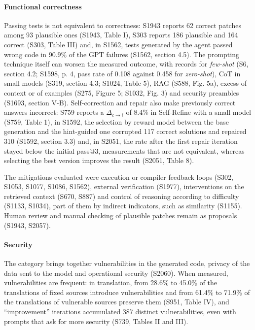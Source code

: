 \paragraph{Functional correctness}
Passing tests is not equivalent to correctness: S1943 reports 62 correct patches among 93 plausible ones (S1943, Table I), S303 reports 186 plausible and 164 correct (S303, Table III) and, in S1562, tests generated by the agent passed wrong code in 90.9\% of the GPT failures (S1562, section 4.5).
The prompting technique itself can worsen the measured outcome, with records for \textit{few-shot} (S6, section 4.2; S1598, p. 4, pass rate of 0.108 against 0.458 for \textit{zero-shot}), CoT in small models (S319, section 4.3; S1024, Table 5), RAG (S588, Fig. 5a), excess of context or of examples (S275, Figure 5; S1032, Fig. 3) and security preambles (S1693, section V-B).
Self-correction and repair also make previously correct answers incorrect: S759 reports a $\Delta_{c \to i}$ of 8.4\% in Self-Refine with a small model (S759, Table 1), in S1592, the selection by reward model between the base generation and the hint-guided one corrupted 117 correct solutions and repaired 310 (S1592, section 3.3) and, in S2051, the rate after the first repair iteration stayed below the initial pass@3, measurements that are not equivalent, whereas selecting the best version improves the result (S2051, Table 8).

The mitigations evaluated were execution or compiler feedback loops (S302, S1053, S1077, S1086, S1562), external verification (S1977), interventions on the retrieved context (S670, S887) and control of reasoning according to difficulty (S1133, S1034), part of them by indirect indicators, such as similarity (S1155). Human review and manual checking of plausible patches remain as proposals (S1943, S2057).

\paragraph{Security}
The category brings together vulnerabilities in the generated code, privacy of the data sent to the model and operational security (S2060).
When measured, vulnerabilities are frequent: in translation, from 28.6\% to 45.0\% of the translations of fixed sources introduce vulnerabilities and from 61.4\% to 71.9\% of the translations of vulnerable sources preserve them (S951, Table IV), and ``improvement'' iterations accumulated 387 distinct vulnerabilities, even with prompts that ask for more security (S739, Tables II and III).

